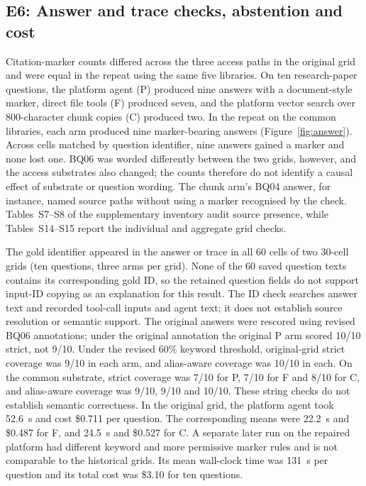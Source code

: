 \subsection{E6: Answer and trace checks, abstention and cost}
\label{sec:e5}
\label{sec:agentic}\label{sec:abstention}\label{sec:composition}\label{sec:eval-agent}
Citation-marker counts differed across the three access paths in the original
grid and were equal in the repeat using the same five libraries. On ten research-paper
questions, the platform agent (P) produced nine answers with a
document-style marker, direct file tools (F) produced seven, and the
platform vector search over 800-character chunk copies (C) produced two.
In the repeat on the common libraries, each arm produced nine marker-bearing
answers (Figure~\ref{fig:answer}). Across cells matched by question identifier,
nine answers gained a marker and none lost one. BQ06 was worded differently
between the two grids, however, and the access substrates also changed; the
counts therefore do not identify a causal effect of substrate or question
wording. The chunk arm's BQ04 answer, for
instance, named source paths without using a marker recognised by the
check. Tables~S7--S8 of the supplementary inventory audit source presence,
while Tables~S14--S15 report the individual and aggregate grid checks.

The gold identifier appeared in the answer or trace in all 60 cells of two
30-cell grids (ten questions, three arms per grid).
None of the 60 saved question texts contains its corresponding gold ID, so
the retained question fields do not support input-ID copying as an explanation
for this result. The ID check searches answer text and recorded tool-call
inputs and agent text; it does not establish source resolution or semantic
support. The original answers were rescored using revised BQ06 annotations;
under the original annotation the original P arm scored 10/10 strict, not
9/10. Under the revised 60\% keyword threshold, original-grid strict
coverage was 9/10 in each arm, and alias-aware coverage was 10/10 in each.
On the common substrate, strict coverage was 7/10 for P, 7/10 for F and
8/10 for C, and alias-aware coverage
was 9/10, 9/10 and 10/10. These string checks do not establish semantic
correctness. In the original grid, the platform agent took 52.6~s and cost
\$0.711 per question. The corresponding means were 22.2~s and \$0.487 for
F, and 24.5~s and \$0.527 for C. A separate later run on the repaired
platform had different keyword and more permissive marker rules and is not
comparable to the historical grids. Its mean wall-clock time was 131~s per
question and its total cost was \$3.10 for ten questions.

